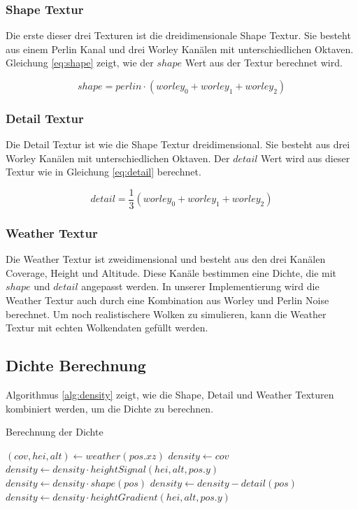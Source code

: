 \subsubsection{Shape Textur}
Die erste dieser drei Texturen ist die dreidimensionale Shape Textur. Sie besteht aus einem Perlin Kanal und drei Worley Kanälen mit unterschiedlichen Oktaven. Gleichung \ref{eq:shape} zeigt, wie der $ shape $ Wert aus der Textur berechnet wird.

\begin{equation}
    shape = perlin \cdot (worley_0 + worley_1 + worley_2)
    \label{eq:shape}
\end{equation}

\subsubsection{Detail Textur}
Die Detail Textur ist wie die Shape Textur dreidimensional. Sie besteht aus drei Worley Kanälen mit unterschiedlichen Oktaven. Der $ detail $ Wert wird aus dieser Textur wie in Gleichung \ref{eq:detail} berechnet.

\begin{equation}
    detail = \frac{1}{3} (worley_0 + worley_1 + worley_2)
    \label{eq:detail}
\end{equation}

\subsubsection{Weather Textur}
Die Weather Textur ist zweidimensional und besteht aus den drei Kanälen Coverage, Height und Altitude. Diese Kanäle bestimmen eine Dichte, die mit $ shape $ und $ detail $ angepasst werden. In unserer Implementierung wird die Weather Textur auch durch eine Kombination aus Worley und Perlin Noise berechnet. Um noch realistischere Wolken zu simulieren, kann die Weather Textur mit echten Wolkendaten gefüllt werden.

\subsection{Dichte Berechnung}
Algorithmus \ref{alg:density} zeigt, wie die Shape, Detail und Weather Texturen kombiniert werden, um die Dichte zu berechnen.

\begin{algorithm}[H]
\caption{Berechnung der Dichte \cite{Högfeldt16}}
\label{alg:density}
\begin{algorithmic}[1]
\State $ (cov, hei, alt) \gets weather(pos.xz) $
\State $ density \gets cov $
\State $ density \gets density \cdot heightSignal(hei, alt, pos.y) $
\State $ density \gets density \cdot shape(pos) $
\State $ density \gets density - detail(pos) $
\State $ density \gets density \cdot heightGradient(hei, alt, pos.y) $
\end{algorithmic}
\end{algorithm}

